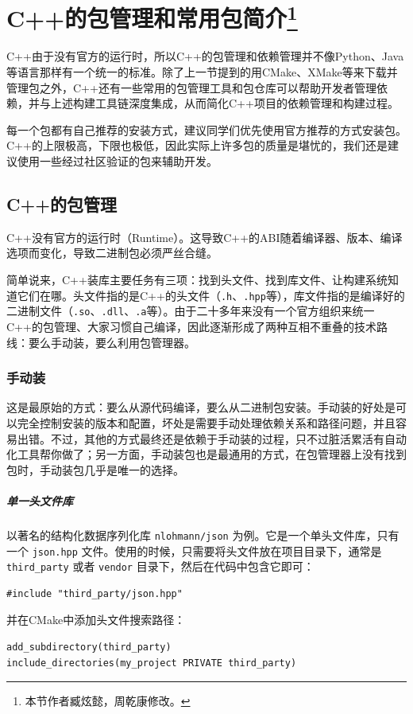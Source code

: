\chapter[C++的包管理和常用包简介]{C++的包管理和常用包简介\protect\footnote{本节作者臧炫懿，周乾康修改。}} 

C++由于没有官方的运行时，所以C++的包管理和依赖管理并不像Python、Java等语言那样有一个统一的标准。除了上一节提到的用CMake、XMake等来下载并管理包之外，C++还有一些常用的包管理工具和包仓库可以帮助开发者管理依赖，并与上述构建工具链深度集成，从而简化C++项目的依赖管理和构建过程。

每一个包都有自己推荐的安装方式，建议同学们优先使用官方推荐的方式安装包。C++的上限极高，下限也极低，因此实际上许多包的质量是堪忧的，我们还是建议使用一些经过社区验证的包来辅助开发。

\section{C++的包管理} 

C++没有官方的运行时（Runtime）。这导致C++的ABI随着编译器、版本、编译选项而变化，导致二进制包必须严丝合缝。

简单说来，C++装库主要任务有三项：找到头文件、找到库文件、让构建系统知道它们在哪。头文件指的是C++的头文件（\verb|.h|、\verb|.hpp|等），库文件指的是编译好的二进制文件（\verb|.so|、\verb|.dll|、\verb|.a|等）。由于二十多年来没有一个官方组织来统一C++的包管理、大家习惯自己编译，因此逐渐形成了两种互相不重叠的技术路线：要么手动装，要么利用包管理器。

\subsection{手动装} 

这是最原始的方式：要么从源代码编译，要么从二进制包安装。手动装的好处是可以完全控制安装的版本和配置，坏处是需要手动处理依赖关系和路径问题，并且容易出错。不过，其他的方式最终还是依赖于手动装的过程，只不过脏活累活有自动化工具帮你做了；另一方面，手动装包也是最通用的方式，在包管理器上没有找到包时，手动装包几乎是唯一的选择。

\paragraph{单一头文件库} 以著名的结构化数据序列化库 \verb|nlohmann/json| 为例。它是一个单头文件库，只有一个 \verb|json.hpp| 文件。使用的时候，只需要将头文件放在项目目录下，通常是 \verb|third_party| 或者 \verb|vendor| 目录下，然后在代码中包含它即可：
\begin{verbatim}
#include "third_party/json.hpp"
\end{verbatim}
并在CMake中添加头文件搜索路径：
\begin{verbatim}
add_subdirectory(third_party)
include_directories(my_project PRIVATE third_party)
\end{verbatim}

